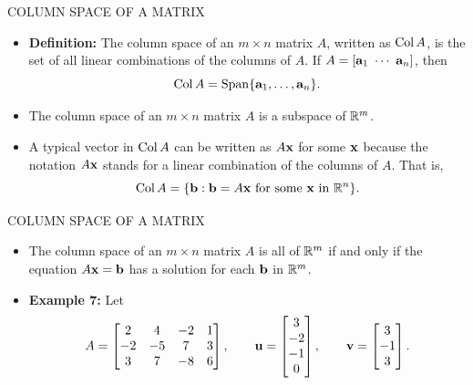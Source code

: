 \begin{frame}[shrink=13]{COLUMN SPACE OF A MATRIX}
\begin{itemize}
\item \textbf{Definition:} The column space of an $m\times n$ matrix $A$, written as $\operatorname{Col} A$, is the set of all linear combinations of the columns of $A$. If $A=[\mathbf{a}_1\ \cdots\ \mathbf{a}_n]$, then
\[
\operatorname{Col} A=\operatorname{Span}\{\mathbf{a}_1,\ldots,\mathbf{a}_n\}.
\]
\item {} The column space of an $m\times n$ matrix $A$ is a subspace of $\mathbb{R}^m$.
\item A typical vector in $\operatorname{Col} A$ can be written as $A\mathbf{x}$ for some $\mathbf{x}$ because the notation $A\mathbf{x}$ stands for a linear combination of the columns of $A$. That is,
\[
\operatorname{Col} A=\{\mathbf{b}:\mathbf{b}=A\mathbf{x}\text{ for some }\mathbf{x}\text{ in }\mathbb{R}^n\}.
\]
\end{itemize}
\end{frame}

\begin{frame}[shrink=13]{COLUMN SPACE OF A MATRIX}
\begin{itemize}
\item The column space of an $m\times n$ matrix $A$ is all of $\mathbb{R}^m$ if and only if the equation $A\mathbf{x}=\mathbf{b}$ has a solution for each $\mathbf{b}$ in $\mathbb{R}^m$.
\item \textbf{Example 7:} Let
\[
A=\begin{bmatrix}2&4&-2&1\\-2&-5&7&3\\3&7&-8&6\end{bmatrix},
\qquad
\mathbf{u}=\begin{bmatrix}3\\-2\\-1\\0\end{bmatrix},
\qquad
\mathbf{v}=\begin{bmatrix}3\\-1\\3\end{bmatrix}.
\]
\end{itemize}
\end{frame}

